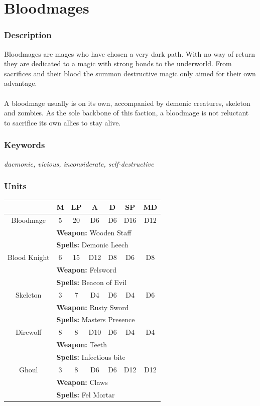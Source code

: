 \documentclass[a5paper,pagesize,10pt,bibtotoc,pointlessnumbers,
normalheadings,DIV=9,twoside=false]{scrbook}
\begin{document}
\newpage
\section{Bloodmages}

\subsubsection{Description}
Bloodmages are mages who have chosen a very dark path. With no way of return they are dedicated to a magic with strong bonds to the underworld.
From sacrifices and their blood the summon destructive magic only aimed for their own advantage.\\
\\
A bloodmage usually is on its own, accompanied by demonic creatures, skeleton and zombies. As the sole backbone of this faction, a bloodmage is not reluctant to sacrifice its own allies to stay alive.

\subsubsection{Keywords}
\emph{daemonic, vicious, inconsiderate, self-destructive}

\subsubsection{Units}
 \begin{tabular}{||c c c c c c c||} 
 \hline
  & M & LP & A & D & SP & MD \\
 \hline\hline
 Bloodmage & 5 & 20 & D6 & D6 & D16 & D12 \\ 
  & \multicolumn{6}{l||}{\textbf{Weapon:} Wooden Staff} \\
  & \multicolumn{6}{l||}{\textbf{Spells:} Demonic Leech} \\
 \hline
 Blood Knight & 6 & 15 & D12 & D8 & D6 & D8 \\
  & \multicolumn{6}{l||}{\textbf{Weapon:} Felsword} \\
  & \multicolumn{6}{l||}{\textbf{Spells:} Beacon of Evil} \\
 \hline
 Skeleton & 3 & 7 & D4 & D6 & D4 & D6 \\
  & \multicolumn{6}{l||}{\textbf{Weapon:} Rusty Sword} \\
  & \multicolumn{6}{l||}{\textbf{Spells:} Masters Presence} \\
\hline
 Direwolf & 8 & 8 & D10 & D6 & D4 & D4 \\
  & \multicolumn{6}{l||}{\textbf{Weapon:} Teeth} \\
  & \multicolumn{6}{l||}{\textbf{Spells:} Infectious bite} \\
\hline
Ghoul & 3 & 8 & D6 & D6 & D12 & D12 \\
  & \multicolumn{6}{l||}{\textbf{Weapon:} Claws} \\
  & \multicolumn{6}{l||}{\textbf{Spells:} Fel Mortar} \\
\hline
\end{tabular}
\end{document}
